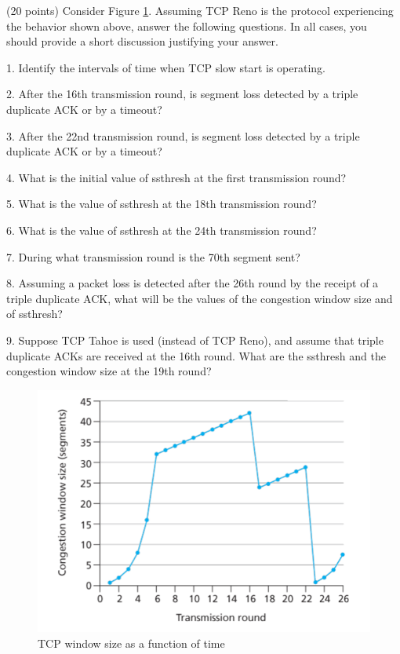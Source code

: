 \begin{exercise}[]{ (20 points) Consider Figure \ref{fig:ex7}. Assuming TCP Reno is the protocol experiencing the behavior shown above, answer the following questions. In all cases, you should provide a short discussion justifying your answer.

    1. Identify the intervals of time when TCP slow start is operating.


    2. After the 16th transmission round, is segment loss detected by a triple duplicate ACK or by a timeout?

    3. After the 22nd transmission round, is segment loss detected by a triple duplicate ACK or by a timeout?

    4. What is the initial value of ssthresh at the first transmission round?

    5. What is the value of ssthresh at the 18th transmission round?

    6. What is the value of ssthresh at the 24th transmission round?

    7. During what transmission round is the 70th segment sent?

    8. Assuming a packet loss is detected after the 26th round by the receipt of a triple duplicate ACK, what will be the values of the congestion window size and of ssthresh?

    9. Suppose TCP Tahoe is used (instead of TCP Reno), and assume that triple duplicate ACKs are received at the 16th round. What are the ssthresh and the congestion window size at the 19th round?

    \begin{figure}[hb]
      \begin{center}
      \includegraphics[width=12cm]{img/ass3/ex7}
      \caption{TCP window size as a function of time}
      \label{fig:ex7}
      \end{center}
    \end{figure}
    }
  \begin{solution}
  \par{~}


\end{solution}
\end{exercise}
